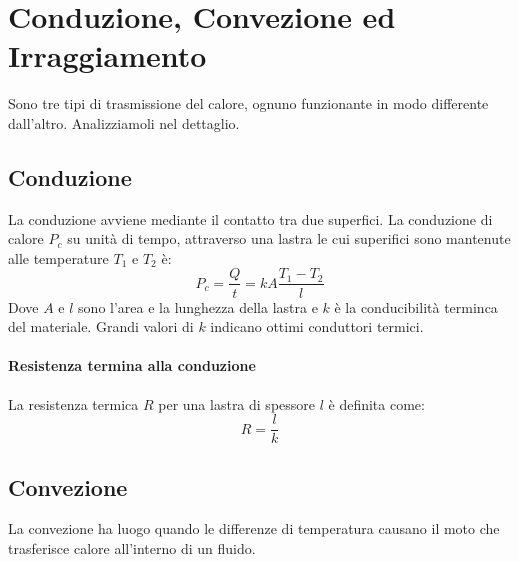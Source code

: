         \section{Conduzione, Convezione ed Irraggiamento} Sono tre tipi di 
        trasmissione del calore, ognuno funzionante in modo differente 
        dall'altro. Analizziamoli nel dettaglio.

            \subsection{Conduzione} La conduzione avviene mediante il contatto
            tra due superfici. La conduzione di calore $P_c$ su unità di tempo,
            attraverso una lastra le cui superifici sono mantenute alle 
            temperature $T_1$ e $T_2$ è:
                \begin{equation}
                    P_c = \frac{Q}{t} = kA\frac{T_1 - T_2}{l}
                \end{equation}
            Dove $A$ e $l$ sono l'area e la lunghezza della lastra e $k$ è la 
            conducibilità terminca del materiale. Grandi valori di $k$ indicano
            ottimi conduttori termici.

            \paragraph{Resistenza termina alla conduzione} La resistenza 
            termica $R$ per una lastra di spessore $l$ è definita come:
                \begin{equation}
                    R = \frac{l}{k}
                \end{equation}

            \subsection{Convezione} La convezione ha luogo quando le differenze
            di temperatura causano il moto che trasferisce calore all'interno 
            di un fluido.

